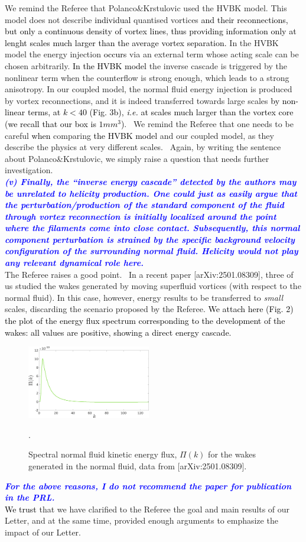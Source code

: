 \documentclass[a4paper,10pt]{article}
\def\red#1{\textcolor{black}{#1}}
\def\blue#1{\textcolor{blue}{#1}}
\def\refcomment#1{\textbf{\blue{\emph{#1}}}\\}
\begin{document}
We remind the Referee that Polanco\&Krstulovic used the HVBK model. 
This model does not describe \red{individual} quantised vortices 
\red{and their reconnections, but only a continuous density of vortex lines}, 
\red{thus providing information only at lenght scales 
much larger than the average vortex separation.} In the HVBK model
the energy injection
\red{occurs} via an external term whose acting scale can be chosen
arbitrarily. 
\red{In the HVBK model} the inverse cascade is triggered by the nonlinear 
term when the counterflow 
is strong enough, which leads to a strong anisotropy. 
In our coupled model, the normal fluid energy injection is produced 
by vortex reconnections, and it is indeed transferred towards large scales 
\red{by non-linear terms, at $k < 40$ (Fig. 3b), \textit{i.e.} at scales much larger than the vortex core (we recall that our box is
$1mm^3$)}. 
We remind the Referee that one needs to be careful \red{when}
comparing \red{the HVBK model} and our coupled model,
as they describe the physics at very different scales.  Again, by writing the sentence about Polanco\&Krstulovic, we simply raise a question that needs further investigation.\\

\refcomment{(v) Finally, the “inverse energy cascade” detected by the authors may be unrelated to helicity production. One could just as easily argue that the perturbation/production of the standard component of the fluid through vortex reconnection is initially localized around the point where the filaments come into close contact. Subsequently, this normal component perturbation is strained by the specific background velocity configuration of the surrounding normal fluid. Helicity would not play any relevant dynamical role here.}

The Referee raises a good point.  In a recent paper [arXiv:2501.08309], three of us studied the wakes generated by moving superfluid vortices (with respect to the normal fluid). In this case, however, energy results to be transferred to \textit{small} scales, discarding the scenario proposed by the Referee. \red{We attach here (Fig. 2) the plot of the energy flux spectrum corresponding to the development of the wakes: all values are positive, showing a direct energy cascade.} \\



%
\begin{figure}[h!]
    \centering
    \includegraphics*[width=0.48\textwidth]{flux_wakes.png}
    \caption{Spectral normal fluid kinetic energy flux, $\Pi (k)$ for the wakes generated in the normal fluid, data from [arXiv:2501.08309].}.
    
\end{figure}

\refcomment{For the above reasons, I do not recommend the paper for publication in the PRL.}

\noindent \red{We trust} that we have clarified to the Referee the goal and main results of our Letter, and at the same time, provided enough arguments to emphasize the impact of our Letter.
\end{document}
